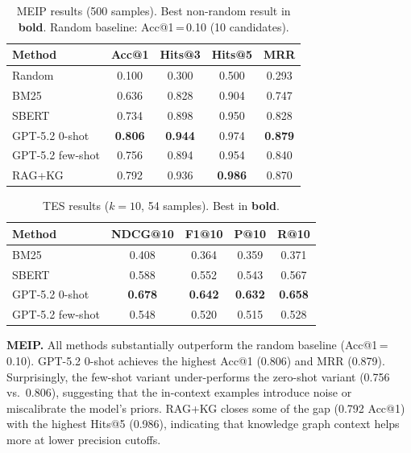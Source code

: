 \documentclass[11pt]{article}
\begin{document}
\begin{table}[h]
\centering
\small
\begin{tabular}{lcccc}
\toprule
\textbf{Method} & \textbf{Acc@1} & \textbf{Hits@3} & \textbf{Hits@5} & \textbf{MRR} \\
\midrule
Random           & 0.100 & 0.300 & 0.500 & 0.293 \\
BM25             & 0.636 & 0.828 & 0.904 & 0.747 \\
SBERT            & 0.734 & 0.898 & 0.950 & 0.828 \\
GPT-5.2 0-shot   & \textbf{0.806} & \textbf{0.944} & 0.974 & \textbf{0.879} \\
GPT-5.2 few-shot & 0.756 & 0.894 & 0.954 & 0.840 \\
RAG+KG           & 0.792 & 0.936 & \textbf{0.986} & 0.870 \\
\bottomrule
\end{tabular}
\caption{MEIP results (500 samples). Best non-random result in \textbf{bold}.
  Random baseline: Acc@1\,=\,0.10 (10 candidates).}
\label{tab:meip}
\end{table}

\begin{table}[h]
\centering
\small
\begin{tabular}{lcccc}
\toprule
\textbf{Method} & \textbf{NDCG@10} & \textbf{F1@10} & \textbf{P@10} & \textbf{R@10} \\
\midrule
BM25             & 0.408 & 0.364 & 0.359 & 0.371 \\
SBERT            & 0.588 & 0.552 & 0.543 & 0.567 \\
GPT-5.2 0-shot   & \textbf{0.678} & \textbf{0.642} & \textbf{0.632} & \textbf{0.658} \\
GPT-5.2 few-shot & 0.548 & 0.520 & 0.515 & 0.528 \\
\bottomrule
\end{tabular}
\caption{TES results ($k=10$, 54 samples). Best in \textbf{bold}.}
\label{tab:tes}
\end{table}

\noindent\textbf{MEIP.}
All methods substantially outperform the random baseline (Acc@1\,=\,0.10).
GPT-5.2 0-shot achieves the highest Acc@1 (0.806) and MRR (0.879).
Surprisingly, the few-shot variant under-performs the zero-shot variant
(0.756 vs.\ 0.806), suggesting that the in-context examples introduce noise
or miscalibrate the model's priors.
RAG+KG closes some of the gap (0.792 Acc@1) with the highest Hits@5 (0.986),
indicating that knowledge graph context helps more at lower precision cutoffs.
\end{document}

